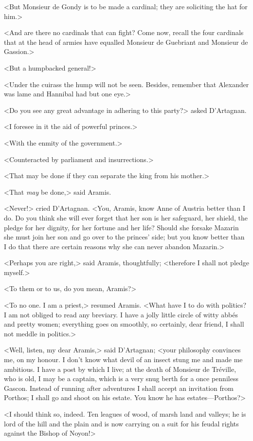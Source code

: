 <But Monsieur de Gondy is to be made a cardinal; they are soliciting the hat for him.>

<And are there no cardinals that can fight? Come now, recall the four cardinals that at the head of armies have equalled Monsieur de Guebriant and Monsieur de Gassion.>

<But a humpbacked general!>

<Under the cuirass the hump will not be seen. Besides, remember that Alexander was lame and Hannibal had but one eye.>

<Do you see any great advantage in adhering to this party?> asked D'Artagnan.

<I foresee in it the aid of powerful princes.>

<With the enmity of the government.>

<Counteracted by parliament and insurrections.>

<That may be done if they can separate the king from his mother.>

<That \emph{may} be done,> said Aramis.

<Never!> cried D'Artagnan. <You, Aramis, know Anne of Austria better than I do. Do you think she will ever forget that her son is her safeguard, her shield, the pledge for her dignity, for her fortune and her life? Should she forsake Mazarin she must join her son and go over to the princes' side; but you know better than I do that there are certain reasons why she can never abandon Mazarin.>

<Perhaps you are right,> said Aramis, thoughtfully; <therefore I shall not pledge myself.>

<To them or to us, do you mean, Aramis?>

<To no one. I am a priest,> resumed Aramis. <What have I to do with politics? I am not obliged to read any breviary. I have a jolly little circle of witty abbés and pretty women; everything goes on smoothly, so certainly, dear friend, I shall not meddle in politics.>

<Well, listen, my dear Aramis,> said D'Artagnan; <your philosophy convinces me, on my honour. I don't know what devil of an insect stung me and made me ambitious. I have a post by which I live; at the death of Monsieur de Tréville, who is old, I may be a captain, which is a very snug berth for a once penniless Gascon. Instead of running after adventures I shall accept an invitation from Porthos; I shall go and shoot on his estate. You know he has estates—Porthos?>

<I should think so, indeed. Ten leagues of wood, of marsh land and valleys; he is lord of the hill and the plain and is now carrying on a suit for his feudal rights against the Bishop of Noyon!>

